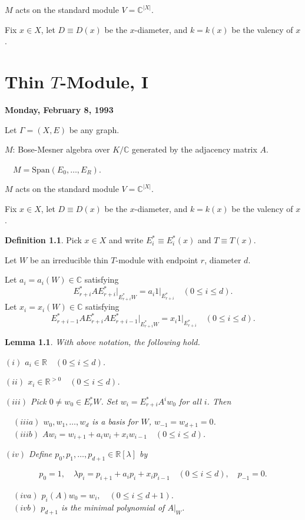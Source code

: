 \documentclass[
]{book}
\newtheorem{lemma}{Lemma}[chapter]
\theoremstyle{definition}
\newtheorem{definition}{Definition}[chapter]
\theoremstyle{definition}
\theoremstyle{definition}
\theoremstyle{definition}
\theoremstyle{remark}
\begin{document}
\(M\) acts on the standard module \(V = \mathbb{C}^{|X|}\).

Fix \(x\in X\), let
\(D \equiv D(x)\) be the \(x\)-diameter, and \(k = k(x)\) be the valency of \(x\).

\hypertarget{lec9}{%
\chapter{\texorpdfstring{Thin \(T\)-Module, I}{Thin T-Module, I}}\label{lec9}}

\textbf{Monday, February 8, 1993}

Let \(\Gamma = (X, E)\) be any graph.

\(M\): Bose-Mesner algebra over \(K/\mathbb{C}\) generated by the adjacency matrix \(A\).

\(\quad M = \mathrm{Span}(E_0, \ldots, E_R)\).

\(M\) acts on the standard module \(V = \mathbb{C}^{|X|}\).

Fix \(x\in X\), let
\(D \equiv D(x)\) be the \(x\)-diameter, and \(k = k(x)\) be the valency of \(x\).

\begin{definition}
Pick \(x\in X\) and write \(E_i^* \equiv E_i^*(x)\) and \(T \equiv T(x)\).

Let \(W\) be an irreducible thin \(T\)-module with endpoint \(r\), diameter \(d\).

Let \(a_i = a_i(W)\in \mathbb{C}\) satisfying
\[E_{r+i}^*A{E^*_{r+i}|}_{E_{r+i}^*W} = a_i1|_{E_{r+i}^*} \quad (0\leq i\leq d).\]
Let \(x_i = x_i(W)\in \mathbb{C}\) satisfying
\[E_{r+i-1}^*A{E^*_{r+i}AE^*_{r+i-1}|}_{E_{r+i}^*W} = x_i1|_{E_{r+i}^*} \quad (0\leq i\leq d).\]
\end{definition}

\begin{lemma}
\protect\hypertarget{lem:thin-module-structure}{}\label{lem:thin-module-structure}With above notation, the following hold.

\((i)\) \(a_i\in \mathbb{R} \quad (0\leq i\leq d)\).

\((ii)\) \(x_i\in \mathbb{R}^{>0} \quad (0\leq i\leq d)\).

\((iii)\) Pick \(0\neq w_0\in E^*_rW\). Set \(w_i = E^*_{r+i}A^iw_0\) for all \(i\). Then

\(\quad (iiia)\) \(w_0, w_1, \ldots, w_d\) is a basis for \(W\), \(w_{-1} = w_{d+1} = 0\).\\
\(\quad (iiib)\) \(Aw_i = w_{i+1} + a_iw_{i} + x_iw_{i-1} \quad (0\leq i\leq d)\).

\((iv)\) Define \(p_0, p_1, \ldots, p_{d+1}\in \mathbb{R}[\lambda]\) by

\[p_0 = 1, \quad \lambda p_i = p_{i+1} + a_i p_i + x_i p_{i-1} \quad (0\leq i\leq d),\quad p_{-1} = 0.\]

\(\quad (iva)\) \(p_i(A)w_0 = w_i, \quad (0\leq i\leq d+1)\).\\
\(\quad (ivb)\) \(p_{d+1}\) is the minimal polynomial of \(A|_W\).
\end{lemma}
\end{document}
